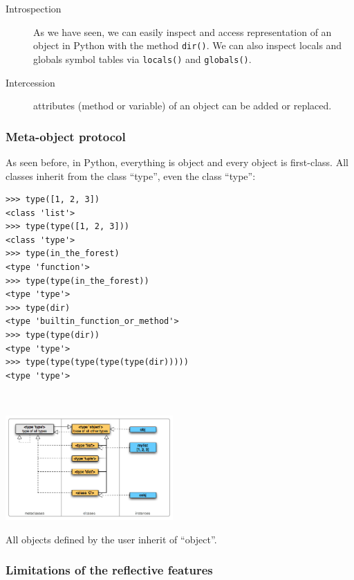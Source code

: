 \documentclass[a4paper,10pt]{article}
\begin{document}
\begin{description}
\item[Introspection] As we have seen, we can easily inspect and access representation of an object in Python with the method \lstinline|dir()|. We can also inspect locals and globals symbol tables via \lstinline|locals()| and \lstinline|globals()|.

\item[Intercession] attributes (method or variable) of an object can be added or replaced.
\end{description}

\subsubsection{Meta-object protocol}

As seen before, in Python, everything is object and every object is first-class. All classes inherit from the class ``type'', even the class ``type'':

\begin{minipage}[c]{.48\linewidth}
\begin{lstlisting}
>>> type([1, 2, 3])
<class 'list'>
>>> type(type([1, 2, 3]))
<class 'type'>
>>> type(in_the_forest)
<type 'function'>
>>> type(type(in_the_forest))
<type 'type'>
>>> type(dir)
<type 'builtin_function_or_method'>
>>> type(type(dir))
<type 'type'>
>>> type(type(type(type(type(dir)))))
<type 'type'>
\end{lstlisting}
~\\
\end{minipage} \hfill
\begin{minipage}[c]{.48\linewidth}
\includegraphics[height=4cm]{typesmap.png}
\end{minipage}

All objects defined by the user inherit of ``object''.

\subsubsection{Limitations of the reflective features}
\end{document}
